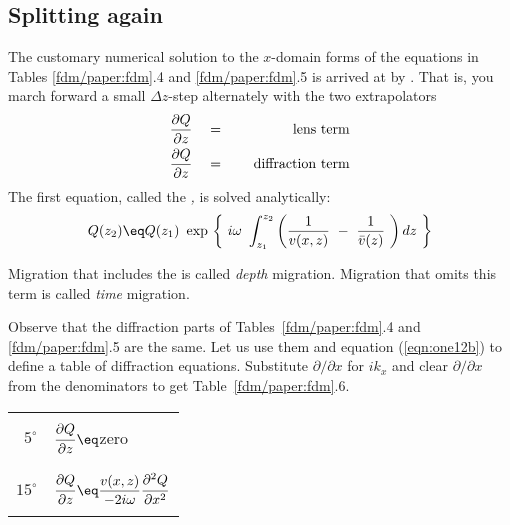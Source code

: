 {\subsection{Splitting again}
The customary numerical solution to the  $x$-domain forms of the equations
in Tables \ref{fdm/paper:fdm}.4 and \ref{fdm/paper:fdm}.5 is arrived at by .
That is, you march forward a small  $ \Delta z $-step alternately
with the two extrapolators
\begin{eqnarray}
{ \partial Q   \over  \partial z } \ \  \ &=&\  \ \  \ \rm{lens\ term}
\label{eqn:one12a}
\\
{ \partial Q   \over  \partial z } \ \  \ &=&\  \ \  \ \rm{diffraction\ term}
\label{eqn:one12b}
\end{eqnarray}
The first equation, called the 
{\em 
{},
}
is solved analytically: 
\begin{equation}
Q ( z_2 ) \eq  Q ( z_1 ) \  \exp \,
\left\{ \  i \omega \ \int_{{z}_1}^{{z}_2}
\left( {1 \over  v(x,z)} \ -\ 
{1 \over \bar v ( z ) } \  \right) dz \  \right\}
\label{eqn:one13}
\end{equation}
\par
Migration that includes the 
is called %
{\em  depth %
} migration.
Migration that omits this term is called 
{\em  time %
} migration.
\par
Observe that the diffraction parts
of Tables~\ref{fdm/paper:fdm}.4 and \ref{fdm/paper:fdm}.5 are the same.
Let us use them and equation (\ref{eqn:one12b}) to
define a table of diffraction equations.
Substitute  $  \partial / \partial x $  for  $ i k_x $  and
clear  $  \partial / \partial x  $  from the denominators to
get Table~\ref{fdm/paper:fdm}.6.
\begin{table}
\begin{center}
\begin{tabular}{|r|l|}     \hline
     &       \\
$5^\circ$ & $ \displaystyle {\strut\partial Q\over
            \partial z}\eq $zero  \\
     &        \\   \hline
     &        \\
$15^\circ$ & $ \displaystyle {\strut\partial Q\over
             \partial z} \eq 
             \displaystyle {v(x, z)\over - 2i\omega}
              {\strut\partial^2 Q\over\partial x^2}$ \\
     &        \\      \hline

\end{tabular}
\end{center}
\end{table}}
